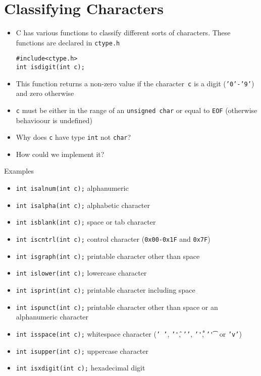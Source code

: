 \documentclass{article}
\begin{document}
\section{Classifying Characters}
\begin{itemize}
\item C has various functions to classify different sorts of characters. These functions are declared in \texttt{ctype.h}
\begin{verbatim}
#include<ctype.h>
int isdigit(int c);
\end{verbatim}
\item This function returns a non-zero value if the character~\texttt{c} is a digit (\texttt{'0'-'9'}) and zero otherwise
\item \texttt{c} must be either in the range of an \texttt{unsigned char} or equal to \texttt{EOF} (otherwise behavioour is undefined)
\item Why does \texttt{c} have type \texttt{int} not \texttt{char}?
\item How could we implement it?
\end{itemize}
Examples
\begin{itemize}
\item \texttt{int isalnum(int c);} alphanumeric
\item \texttt{int isalpha(int c);} alphabetic character
\item \texttt{int isblank(int c);} space or tab character
\item \texttt{int iscntrl(int c);} control character (\texttt{0x00-0x1F} and \texttt{0x7F})
\item \texttt{int isgraph(int c);} printable character other than space
\item \texttt{int islower(int c);} lowercase character
\item \texttt{int isprint(int c);} printable character including space
\item \texttt{int ispunct(int c);} printable character other than space or an alphanumeric character
\item \texttt{int isspace(int c);} whitespace character (\texttt{' '}, \texttt{'\f'}, \texttt{'\n'}, \texttt{'\r'}, \texttt{'\t'} or \texttt{'v'})
\item \texttt{int isupper(int c);} uppercase character
\item \texttt{int isxdigit(int c);} hexadecimal digit
\end{itemize}
\end{document}
